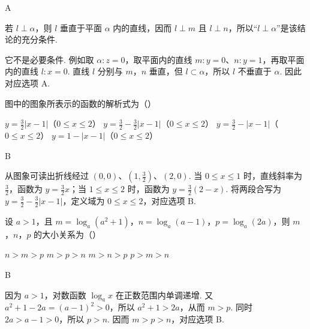 \begin{answer}
A
\end{answer}

\begin{solution}
若 \(l\perp\alpha\)，则 \(l\) 垂直于平面 \(\alpha\) 内的直线，因而
\(l\perp m\) 且 \(l\perp n\)，所以“\(l\perp\alpha\)”是该结论的充分条件.

它不是必要条件. 例如取 \(\alpha:z=0\)，取平面内的直线
\(m:y=0\)、\(n:y=1\)，再取平面内的直线 \(l:x=0\). 直线 \(l\) 分别与
\(m\)，\(n\) 垂直，但 \(l\subset\alpha\)，所以 \(l\) 不垂直于 \(\alpha\). 因此对应选项 A.
\end{solution}

\begin{problem}
图中的图象所表示的函数的解析式为（\quad）


\choices
    {\( y = \frac{3}{2} |x - 1| \)（\(0 \leqslant x \leqslant 2\)）}
    {\( y = \frac{3}{2} - \frac{3}{2} |x - 1| \)（\(0 \leqslant x \leqslant 2\)）}
    {\( y = \frac{3}{2} - |x - 1| \)（\(0 \leqslant x \leqslant 2\)）}
    {\( y = 1 - |x - 1| \)（\(0 \leqslant x \leqslant 2\)）}
\end{problem}

\begin{answer}
B
\end{answer}

\begin{solution}
从图象可读出折线经过 \((0,0)\)、\(\left(1,\frac32\right)\)、\((2,0)\). 当
\(0\leqslant x\leqslant1\) 时，直线斜率为 \(\frac32\)，函数为 \(y=\frac32x\)；当
\(1\leqslant x\leqslant2\) 时，函数为 \(y=\frac32(2-x)\). 将两段合写为
\(y=\frac32-\frac32|x-1|\)，定义域为 \(0\leqslant x\leqslant2\)，对应选项 B.
\end{solution}

\begin{problem}
设 \(a > 1\)，且 \(m = \log_a(a^2 + 1)\)，\(n = \log_a(a - 1)\)，\(p = \log_a(2a)\)，则 \(m\)，\(n\)，\(p\) 的大小关系为（\quad）

\choices
    {\(n > m > p\)}
    {\(m > p > n\)}
    {\(m > n > p\)}
    {\(p > m > n\)}
\end{problem}

\begin{answer}
B
\end{answer}

\begin{solution}
因为 \(a>1\)，对数函数 \(\log_a x\) 在正数范围内单调递增. 又
\(a^{2}+1-2a=(a-1)^{2}>0\)，所以 \(a^{2}+1>2a\)，从而 \(m>p\). 同时
\(2a>a-1>0\)，所以 \(p>n\). 因而 \(m>p>n\)，对应选项 B.
\end{solution}

